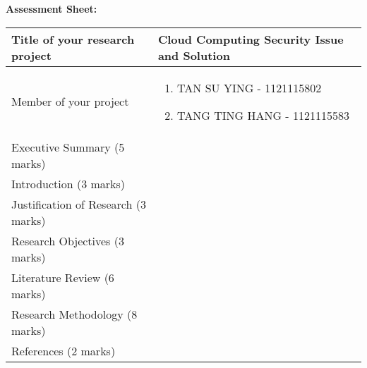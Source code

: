 \documentclass[a4paper, 12pt]{article}
\begin{document}
\flushleft \textbf{ Assessment Sheet: } \\

\begin{center}

\begin{tabular}{|m{7cm} |>{\centering\arraybackslash} m{8.72cm} |}
\hline
Title of your research project & Cloud Computing Security Issue and Solution\\ \hline

Member of your project & 

\begin{enumerate}
\item TAN SU YING - 1121115802
\item TANG TING HANG - 1121115583
\end{enumerate} \\ \hline

Executive Summary (5 marks) & \\ [3ex] \hline 

Introduction (3 marks) & \\ [3ex] \hline

Justification of Research (3 marks) & \\ [3ex] \hline

Research Objectives (3 marks) & \\ [3ex] \hline

Literature Review (6 marks) & \\ [3ex] \hline

Research Methodology (8 marks) & \\ [3ex] \hline

References (2 marks) & \\ [3ex] \hline

\end{tabular}

\end{center}
\end{document}
